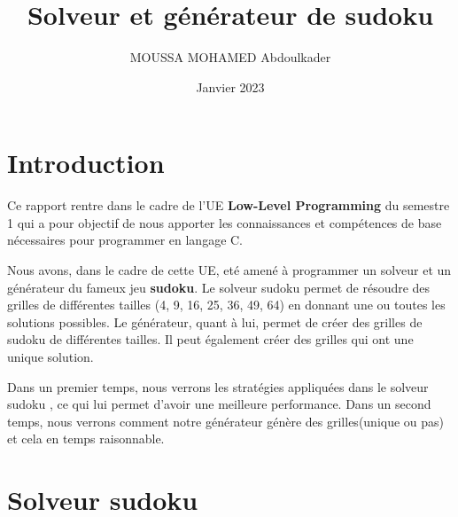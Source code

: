\documentclass{article}
\title{Solveur et générateur de sudoku}
\author{
  MOUSSA MOHAMED Abdoulkader
}
\date{Janvier 2023}
\begin{document}
\maketitle

\section{Introduction}
Ce rapport rentre dans le cadre de l'UE \textbf{Low-Level Programming} du semestre 1 qui a pour
objectif de nous apporter les connaissances et compétences de base nécessaires pour programmer en langage C. \vspace{0.3cm}

Nous avons, dans le cadre de cette UE, eté amené à programmer un solveur et un générateur  du fameux jeu \textbf{sudoku}. Le solveur sudoku permet de résoudre des grilles de différentes tailles (4, 9, 16, 25, 36, 49, 64) en donnant une ou toutes les solutions possibles. Le générateur, quant à lui, permet de créer des grilles de sudoku de différentes tailles. Il peut également créer des grilles qui ont une unique solution.
\vspace{0.3cm}

Dans un premier temps, nous verrons les stratégies appliquées dans le solveur sudoku , ce qui lui permet  d'avoir une meilleure performance.
Dans un second temps, nous verrons comment notre générateur génère des grilles(unique ou pas) et cela en temps raisonnable. 


\section{Solveur sudoku}
\end{document}

